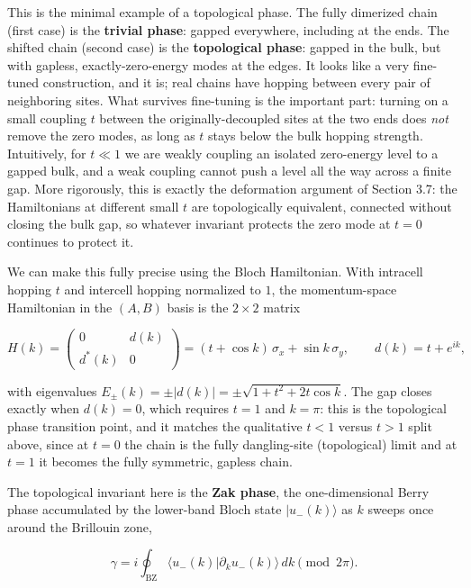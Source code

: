 This is the minimal example of a topological phase. The fully dimerized chain (first case) is the
\textbf{trivial phase}: gapped everywhere, including at the ends. The shifted chain (second case) is the
\textbf{topological phase}: gapped in the bulk, but with gapless, exactly-zero-energy modes at the edges.
It looks like a very fine-tuned construction, and it is; real chains have hopping between every pair
of neighboring sites. What survives fine-tuning is the important part: turning on a small coupling
$t$ between the originally-decoupled sites at the two ends does \emph{not} remove the zero modes, as long
as $t$ stays below the bulk hopping strength. Intuitively, for $t \ll 1$ we are weakly coupling an
isolated zero-energy level to a gapped bulk, and a weak coupling cannot push a level all the way
across a finite gap. More rigorously, this is exactly the deformation argument of Section 3.7: the
Hamiltonians at different small $t$ are topologically equivalent, connected without closing the bulk
gap, so whatever invariant protects the zero mode at $t=0$ continues to protect it.

We can make this fully precise using the Bloch Hamiltonian. With intracell hopping $t$ and intercell
hopping normalized to $1$, the momentum-space Hamiltonian in the $(A,B)$ basis is the $2\times 2$
matrix

\begin{equation}
H(k) = \begin{pmatrix} 0 & d(k) \\ d^*(k) & 0 \end{pmatrix}
= (t + \cos k)\,\sigma_x + \sin k\,\sigma_y, \qquad d(k) = t + e^{ik},
\end{equation}

with eigenvalues $E_\pm(k) = \pm|d(k)| = \pm\sqrt{1 + t^2 + 2t\cos k}$. The gap closes exactly when
$d(k)=0$, which requires $t=1$ and $k=\pi$: this is the topological phase transition point, and it
matches the qualitative $t<1$ versus $t>1$ split above, since at $t=0$ the chain is the fully
dangling-site (topological) limit and at $t=1$ it becomes the fully symmetric, gapless chain.

The topological invariant here is the \textbf{Zak phase}, the one-dimensional Berry phase accumulated by
the lower-band Bloch state $|u_-(k)\rangle$ as $k$ sweeps once around the Brillouin zone,

\begin{equation}
\gamma = i \oint_{\text{BZ}} \langle u_-(k)|\partial_k u_-(k)\rangle\, dk \pmod{2\pi}.
\end{equation}

